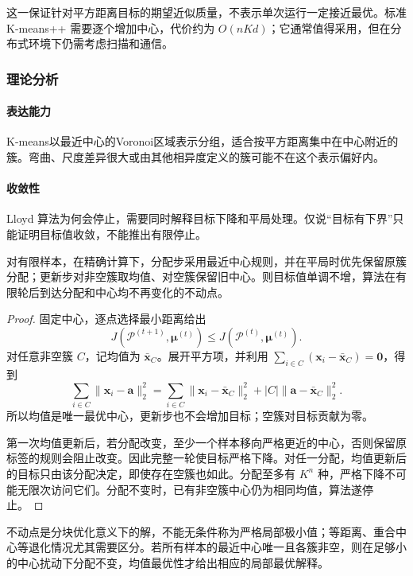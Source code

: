这一保证针对平方距离目标的期望近似质量，不表示单次运行一定接近最优。标准 K-means++ 需要逐个增加中心，代价约为 $O(nKd)$；它通常值得采用，但在分布式环境下仍需考虑扫描和通信。

\subsubsection{理论分析}

\paragraph{表达能力}
K-means以最近中心的Voronoi区域表示分组，适合按平方距离集中在中心附近的簇。弯曲、尺度差异很大或由其他相异度定义的簇可能不在这个表示偏好内。

\paragraph{收敛性}
Lloyd 算法为何会停止，需要同时解释目标下降和平局处理。仅说“目标有下界”只能证明目标值收敛，不能推出有限停止。

\begin{theorem}
  \label{thm:clustering-lloyd}
  对有限样本，在精确计算下，分配步采用最近中心规则，并在平局时优先保留原簇分配；更新步对非空簇取均值、对空簇保留旧中心。则目标值单调不增，算法在有限轮后到达分配和中心均不再变化的不动点。
\end{theorem}
\begin{proof}
固定中心，逐点选择最小距离给出
\[
 J(\mathcal{P}^{(t+1)},\bm{\mu}^{(t)})
 \leq J(\mathcal{P}^{(t)},\bm{\mu}^{(t)}).
\]
对任意非空簇 $C$，记均值为 $\bar{\bm{x}}_C$。展开平方项，并利用 $\sum_{i\in C}(\bm{x}_i-\bar{\bm{x}}_C)=\bm{0}$，得到
\begin{equation}
 \sum_{i\in C}\lVert\bm{x}_i-\bm{a}\rVert_2^2
 =\sum_{i\in C}\lVert\bm{x}_i-\bar{\bm{x}}_C\rVert_2^2
   +|C|\lVert\bm{a}-\bar{\bm{x}}_C\rVert_2^2.
 \label{eq:clustering-mean-decomposition}
\end{equation}
所以均值是唯一最优中心，更新步也不会增加目标；空簇对目标贡献为零。

第一次均值更新后，若分配改变，至少一个样本移向严格更近的中心，否则保留原标签的规则会阻止改变。因此完整一轮使目标严格下降。对任一分配，均值更新后的目标只由该分配决定，即使存在空簇也如此。分配至多有 $K^n$ 种，严格下降不可能无限次访问它们。分配不变时，已有非空簇中心仍为相同均值，算法遂停止。
\end{proof}

不动点是分块优化意义下的解，不能无条件称为严格局部极小值；等距离、重合中心等退化情况尤其需要区分。若所有样本的最近中心唯一且各簇非空，则在足够小的中心扰动下分配不变，均值最优性才给出相应的局部最优解释。

